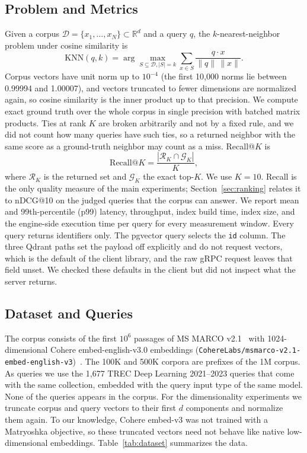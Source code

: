 \documentclass[sigconf, nonacm]{acmart}
\begin{document}
\subsection{Problem and Metrics}

Given a corpus $\mathcal{D}=\{x_1,\dots,x_N\}\subset\mathbb{R}^d$ and a query $q$, the
$k$-nearest-neighbor problem under cosine similarity is
\begin{equation}
\text{KNN}(q,k)=\arg\max_{S\subseteq\mathcal{D},|S|=k}\sum_{x\in S}
\frac{q\cdot x}{\|q\|\,\|x\|}.
\end{equation}
Corpus vectors have unit norm up to $10^{-4}$ (the first 10{,}000 norms lie between 0.99994
and 1.00007), and vectors truncated to fewer dimensions are normalized again, so cosine
similarity is the inner product up to that precision. We compute exact ground truth over the
whole corpus in single precision with batched matrix products. Ties at rank $K$ are broken
arbitrarily and not by a fixed rule, and we did not count how many queries have such ties,
so a returned neighbor with the same score as a ground-truth neighbor may count as a miss.
Recall@$K$ is
\begin{equation}
\text{Recall@}K=\frac{|\mathcal{R}_K\cap\mathcal{G}_K|}{K},
\end{equation}
where $\mathcal{R}_K$ is the returned set and $\mathcal{G}_K$ the exact top-$K$. We use
$K=10$. Recall is the only quality measure of the main experiments; Section~\ref{sec:ranking} relates it to
nDCG@10 on the judged queries that the corpus can answer. We report mean and 99th-percentile (p99) latency, throughput, index build time,
index size, and the engine-side execution time per query for every measurement window.
Every query returns identifiers only. The pgvector query selects the \texttt{id} column. The
three Qdrant paths set the payload off explicitly and do not request vectors, which is the
default of the client library, and the raw gRPC request leaves that field unset. We checked
these defaults in the client but did not inspect what the server returns.

\subsection{Dataset and Queries}

The corpus consists of the first $10^6$ passages of MS MARCO v2.1~\cite{msmarco} with
1024-dimensional Cohere embed-english-v3.0 embeddings
(\texttt{CohereLabs/msmarco-v2.1-embed-english-v3})~\cite{cohere2024}. The 100K and 500K
corpora are prefixes of the 1M corpus. As queries we use the 1{,}677 TREC Deep Learning
2021--2023 queries that come with the same collection, embedded with the query input
type of the same model. None of the queries appears in the corpus. For the
dimensionality experiments we truncate corpus and query vectors to their first $d$
components and normalize them again. To our knowledge, Cohere embed-v3 was not trained with a
Matryoshka objective, so these truncated vectors need not behave like native low-dimensional
embeddings. Table~\ref{tab:dataset} summarizes the data.
\end{document}
